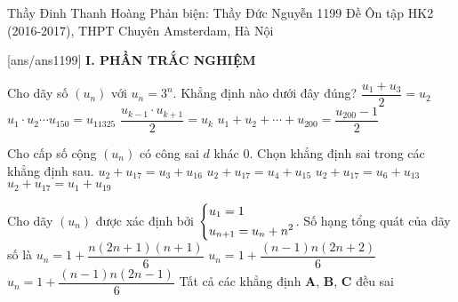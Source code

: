 \begin{name}
{Thầy Đinh Thanh Hoàng \newline Phản biện: Thầy Đức Nguyễn}
{1199 Đề Ôn tập HK2 (2016-2017), THPT Chuyên Amsterdam, Hà Nội}
	\end{name}
	\setcounter{ex}{0}\setcounter{bt}{0}
	[ans/ans1199]
\noindent\textbf{I. PHẦN TRẮC NGHIỆM}
\begin{ex}%
	Cho dãy số $(u_n)$ với $u_n = 3^n$. Khẳng định nào dưới đây đúng?
	\choice
	{$\dfrac{u_1 + u_3}{2} = u_2$}
	{\True $u_1 \cdot u_2 \cdots u_{150} = u_{11325}$}
	{$\dfrac{u_{k-1} \cdot u_{k+1}}{2} = u_k$}
	{$u_1 + u_2 + \cdots + u_{200} = \dfrac{u_{200} - 1}{2}$}
\end{ex}

\begin{ex}%
	Cho cấp số cộng $(u_n)$ có công sai $d$ khác $0$. Chọn khẳng định sai trong các khẳng định sau.
	\choice
	{$u_2 + u_{17} = u_3 + u_{16}$}
	{$u_2 + u_{17} = u_4 + u_{15}$}
	{$u_2 + u_{17} = u_6 + u_{13}$}
	{\True $u_2 + u_{17} = u_1 + u_{19}$}
\end{ex}

\begin{ex}%
	Cho dãy $(u_n)$ được xác định bởi $\left\{\begin{aligned}&u_1 = 1 \\ &u_{n+1} = u_n + n^2\end{aligned}\right.$. Số hạng tổng quát của dãy số là
	\choice
	{$u_n = 1 + \dfrac{n(2n+1)(n+1)}{6}$}
	{$u_n = 1 + \dfrac{(n-1)n(2n+2)}{6}$}
	{\True $u_n = 1 + \dfrac{(n-1)n(2n-1)}{6}$}
	{Tất cả các khẳng định \textbf{A}, \textbf{B}, \textbf{C} đều sai}
\end{ex}

